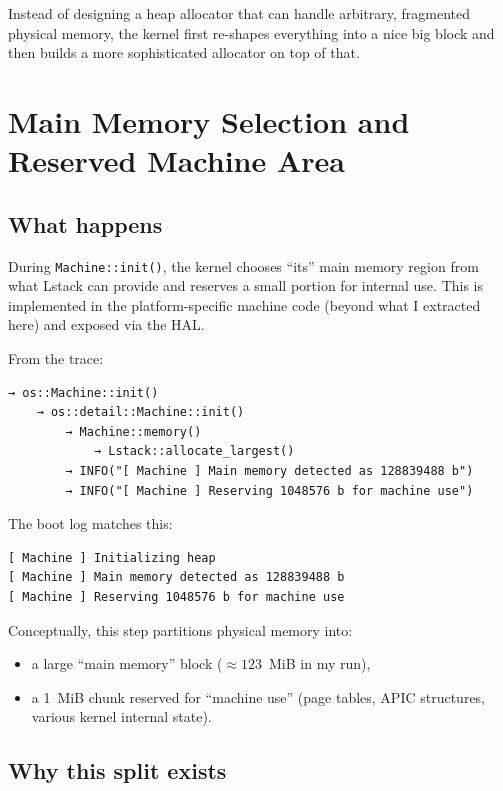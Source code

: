 \documentclass[a4paper,11pt]{article}
\begin{document}
Instead of designing a heap allocator that can handle arbitrary,
fragmented physical memory, the kernel first re-shapes everything into a
nice big block and then builds a more sophisticated allocator on top of
that.

\section{Main Memory Selection and Reserved Machine Area}

\subsection{What happens}

During \texttt{Machine::init()}, the kernel chooses “its” main memory
region from what Lstack can provide and reserves a small portion for
internal use. This is implemented in the platform-specific machine code
(beyond what I extracted here) and exposed via the HAL.

From the trace:

\begin{verbatim}
→ os::Machine::init()
    → os::detail::Machine::init()
        → Machine::memory()
            → Lstack::allocate_largest()
        → INFO("[ Machine ] Main memory detected as 128839488 b")
        → INFO("[ Machine ] Reserving 1048576 b for machine use")
\end{verbatim}

The boot log matches this:

\begin{verbatim}
[ Machine ] Initializing heap
[ Machine ] Main memory detected as 128839488 b
[ Machine ] Reserving 1048576 b for machine use
\end{verbatim}

Conceptually, this step partitions physical memory into:

\begin{itemize}
  \item a large “main memory” block (\(\approx 123\)~MiB in my run),
  \item a 1~MiB chunk reserved for “machine use” (page tables, APIC
        structures, various kernel internal state).
\end{itemize}

\subsection{Why this split exists}
\end{document}
